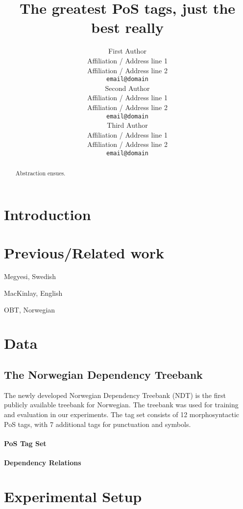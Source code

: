 \documentclass[11pt]{article}
\title{The greatest PoS tags, just the best really}
\author{First Author \\
  Affiliation / Address line 1 \\
  Affiliation / Address line 2 \\
  {\tt email@domain} \\\And
  Second Author \\
  Affiliation / Address line 1 \\
  Affiliation / Address line 2 \\
  {\tt email@domain}  \\\And
  Third Author \\
  Affiliation / Address line 1 \\
  Affiliation / Address line 2 \\
  {\tt email@domain} \\}
\date{}
\begin{document}
\maketitle
\begin{abstract}
Abstraction ensues.
\end{abstract}



\section{Introduction}
\label{sec:intro}

\section{Previous/Related work}
\label{sec:prev}

Megyesi, Swedish

MacKinlay, English

OBT, Norwegian

\section{Data}
\label{sec:data}
\subsection{The Norwegian Dependency Treebank}
The newly developed Norwegian Dependency Treebank (NDT) \cite{Sol:Skj:Ovr:14}
is the first publicly available treebank for Norwegian. The treebank was used
for training and evaluation in our experiments. The tag set consists of 12
morphosyntactic PoS tags, with 7 additional tags for punctuation and symbols.

\paragraph{PoS Tag Set}
\paragraph{Dependency Relations}

\section{Experimental Setup}
\label{sec:setup}
\end{document}
